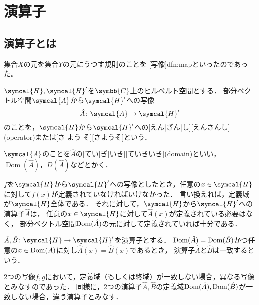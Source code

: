 \documentclass[../sotsu.tex]{subfiles}
\begin{document}
\section{演算子}

\subsection{演算子とは}

集合$X$の元を集合$Y$の元にうつす規則のことを-[写像]{dfn:map}といったのであった。

\begin{definition}[演算子]
    $\symcal{H}, \symcal{H}'$を$\symbb{C}$上のヒルベルト空間とする．
    部分ベクトル空間$\symcal{A}$から$\symcal{H}'$への写像
    \begin{equation*}
        \hat{A} \colon \symcal{A} \to \symcal{H}'
    \end{equation*}
    のことを，$\symcal{H}$から$\symcal{H}'$への[えん|ざん|し][えんさんし](operator)または[さ|よう|そ][さようそ]という．
\end{definition}

\begin{definition}[演算子の定義域]
    $\symcal{A}$のことを$\hat{A}$の[てい|ぎ|いき][ていきいき](domain)といい，$\operatorname{Dom}(\hat{A})$，$D(\hat{A})$などとかく．
\end{definition}

$f$を$\symcal{H}$から$\symcal{H}'$への写像としたとき，任意の$x \in \symcal{H}$に対して$f(x)$が定義されていなければいけなかった．
言い換えれば，定義域が$\symcal{H}$全体である．
それに対して，$\symcal{H}$から$\symcal{H}'$への演算子$\hat{A}$は，
任意の$x \in \symcal{H}$に対して$\hat{A}(x)$が定義されている必要はなく，
部分ベクトル空間$\operatorname{Dom}(\hat{A})$の元に対して定義されていれば十分である．


\begin{definition}[演算子の一致]
    $\hat{A}, \hat{B} \colon \symcal{H} \to \symcal{H}'$を演算子とする．
    $\operatorname{Dom}(\hat{A}) = \operatorname{Dom}(\hat{B})$かつ任意の$x \in \operatorname{Dom}(A)$に対し$\hat{A}(x) = \hat{B}(x)$であるとき，
    演算子$\hat{A}$と$\hat{B}$は一致するという．
\end{definition}

2つの写像$f, g$において，定義域（もしくは終域）が一致しない場合，異なる写像とみなすのであった．
同様に，2つの演算子$\hat{A}, \hat{B}$の定義域$\operatorname{Dom}(\hat{A}), \operatorname{Dom}(\hat{B})$が一致しない場合，違う演算子とみなす．
\end{document}
